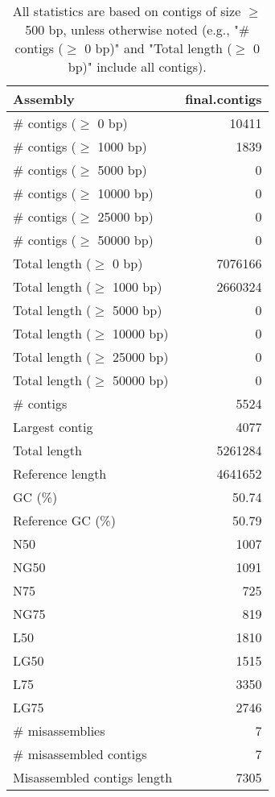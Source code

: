 \documentclass[12pt,a4paper]{article}
\begin{document}
\begin{table}[ht]
\begin{center}
\caption{All statistics are based on contigs of size $\geq$ 500 bp, unless otherwise noted (e.g., "\# contigs ($\geq$ 0 bp)" and "Total length ($\geq$ 0 bp)" include all contigs).}
\begin{tabular}{|l*{1}{|r}|}
\hline
Assembly & final.contigs \\ \hline
\# contigs ($\geq$ 0 bp) & 10411 \\ \hline
\# contigs ($\geq$ 1000 bp) & 1839 \\ \hline
\# contigs ($\geq$ 5000 bp) & 0 \\ \hline
\# contigs ($\geq$ 10000 bp) & 0 \\ \hline
\# contigs ($\geq$ 25000 bp) & 0 \\ \hline
\# contigs ($\geq$ 50000 bp) & 0 \\ \hline
Total length ($\geq$ 0 bp) & 7076166 \\ \hline
Total length ($\geq$ 1000 bp) & 2660324 \\ \hline
Total length ($\geq$ 5000 bp) & 0 \\ \hline
Total length ($\geq$ 10000 bp) & 0 \\ \hline
Total length ($\geq$ 25000 bp) & 0 \\ \hline
Total length ($\geq$ 50000 bp) & 0 \\ \hline
\# contigs & 5524 \\ \hline
Largest contig & 4077 \\ \hline
Total length & 5261284 \\ \hline
Reference length & 4641652 \\ \hline
GC (\%) & 50.74 \\ \hline
Reference GC (\%) & 50.79 \\ \hline
N50 & 1007 \\ \hline
NG50 & 1091 \\ \hline
N75 & 725 \\ \hline
NG75 & 819 \\ \hline
L50 & 1810 \\ \hline
LG50 & 1515 \\ \hline
L75 & 3350 \\ \hline
LG75 & 2746 \\ \hline
\# misassemblies & 7 \\ \hline
\# misassembled contigs & 7 \\ \hline
Misassembled contigs length & 7305 \\ \hline

\end{tabular}
\end{center}
\end{table}
\end{document}
